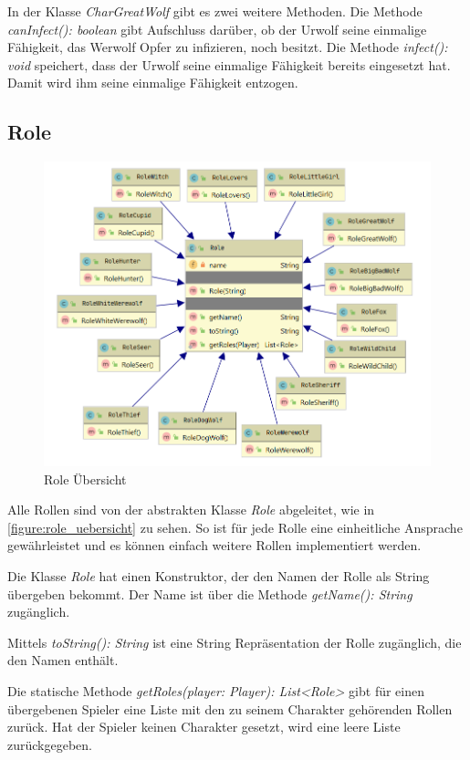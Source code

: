 \medskip
In der Klasse \textit{CharGreatWolf} gibt es zwei weitere Methoden. 
Die Methode \textit{canInfect(): boolean} gibt Aufschluss darüber, ob der Urwolf seine einmalige Fähigkeit, das Werwolf Opfer zu infizieren, noch besitzt. 
Die Methode \textit{infect(): void} speichert, dass der Urwolf seine einmalige Fähigkeit bereits eingesetzt hat. Damit wird ihm seine einmalige Fähigkeit entzogen. 

\subsection{Role}

\begin{figure}[H]
	\centering
	\includegraphics[width=\textwidth]{architektur/role_uml.png}
	\caption{Role Übersicht}
	\label{figure:role_uebersicht}
\end{figure}

Alle Rollen sind von der abstrakten Klasse \textit{Role} abgeleitet, wie in \autoref{figure:role_uebersicht} zu sehen. So ist für jede Rolle eine einheitliche Ansprache gewährleistet und es können einfach weitere Rollen implementiert werden. 

\medskip
Die Klasse \textit{Role} hat einen Konstruktor, der den Namen der Rolle als String übergeben bekommt. 
Der Name ist über die Methode \textit{getName(): String} zugänglich. 

\medskip
Mittels \textit{toString(): String} ist eine String Repräsentation der Rolle zugänglich, die den Namen enthält. 

\medskip
Die statische Methode \textit{getRoles(player: Player): List<Role>} gibt für einen übergebenen Spieler eine Liste mit den zu seinem Charakter gehörenden Rollen zurück. Hat der Spieler keinen Charakter gesetzt, wird eine leere Liste zurückgegeben. 

